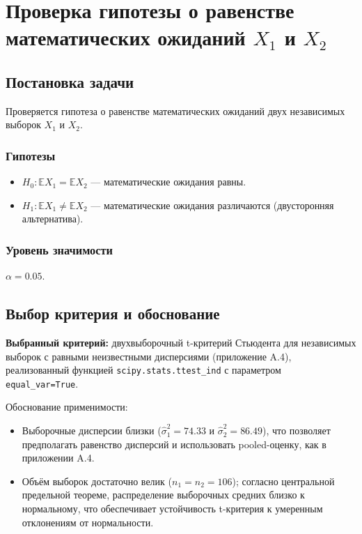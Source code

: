 \section{Проверка гипотезы о равенстве математических ожиданий \(X_1\) и \(X_2\)}

\subsection{Постановка задачи}

Проверяется гипотеза о равенстве математических ожиданий двух независимых выборок \(X_1\) и \(X_2\).

\subsubsection{Гипотезы}
\begin{itemize}
    \item \(H_0: \mathbb{E}X_1 = \mathbb{E}X_2\) — математические ожидания равны.
    \item \(H_1: \mathbb{E}X_1 \neq \mathbb{E}X_2\) — математические ожидания различаются (двусторонняя альтернатива).
\end{itemize}

\subsubsection{Уровень значимости}
\(\alpha = 0.05\).

\subsection{Выбор критерия и обоснование}

\textbf{Выбранный критерий:} двухвыборочный t-критерий Стьюдента для независимых выборок с равными неизвестными дисперсиями (приложение A.4), реализованный функцией \texttt{scipy.stats.ttest\_ind} с параметром \texttt{equal\_var=True}.

Обоснование применимости:
\begin{itemize}
    \item Выборочные дисперсии близки (\(\hat{\sigma}_1^2 = 74.33\) и \(\hat{\sigma}_2^2 = 86.49\)), что позволяет предполагать равенство дисперсий и использовать pooled-оценку, как в приложении A.4.
    \item Объём выборок достаточно велик (\(n_1 = n_2 = 106\)); согласно центральной предельной теореме, распределение выборочных средних близко к нормальному, что обеспечивает устойчивость t-критерия к умеренным отклонениям от нормальности.
\end{itemize}

